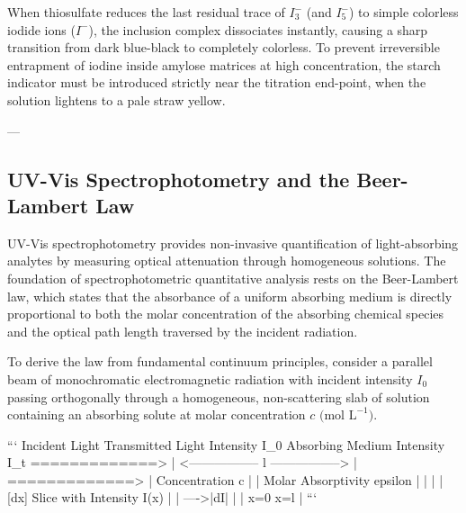\documentclass[12pt]{article}
\begin{document}
When thiosulfate reduces the last residual trace of $I_3^-$ (and $I_5^-$) to simple colorless iodide ions ($I^-$), the inclusion complex dissociates instantly, causing a sharp transition from dark blue-black to completely colorless. To prevent irreversible entrapment of iodine inside amylose matrices at high concentration, the starch indicator must be introduced strictly near the titration end-point, when the solution lightens to a pale straw yellow.

---

\subsection{UV-Vis Spectrophotometry and the Beer-Lambert Law}

UV-Vis spectrophotometry provides non-invasive quantification of light-absorbing analytes by measuring optical attenuation through homogeneous solutions. The foundation of spectrophotometric quantitative analysis rests on the Beer-Lambert law, which states that the absorbance of a uniform absorbing medium is directly proportional to both the molar concentration of the absorbing chemical species and the optical path length traversed by the incident radiation.

To derive the law from fundamental continuum principles, consider a parallel beam of monochromatic electromagnetic radiation with incident intensity $I_0$ passing orthogonally through a homogeneous, non-scattering slab of solution containing an absorbing solute at molar concentration $c \text{ (mol L}^{-1}\text{)}$.

```
Incident Light                                         Transmitted Light
Intensity I_0               Absorbing Medium            Intensity I_t
=============> | <----------------- l -----------------> | =============>
               |  Concentration c                       |
               |  Molar Absorptivity epsilon            |
               |                                        |
               | [dx] Slice with Intensity I(x)         |
               | ---->|dI|                              |
               | x=0                                x=l |
```
\end{document}
